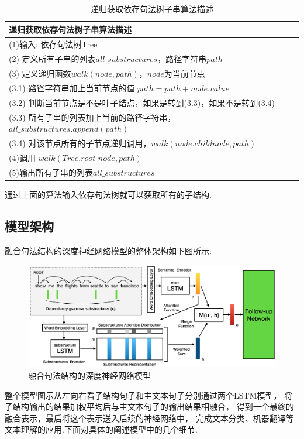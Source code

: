 \documentclass[bachelor,adobefonts]{jnuthesis}
\begin{document}
\begin{table}[h!]
  \centering
  \begin{tabular}{l}
    \toprule
    \textbf{递归获取依存句法树子串算法描述} \\
    \midrule
    (1)输入: 依存句法树Tree \\
    (2) 定义所有子串的列表$all\_substructures$，路径字符串$path$ \\
    (3) 定义递归函数$walk(node,path)$，$node$为当前节点 \\
    (3.1) 路径字符串加上当前节点的值 $path = path + node.value$ \\
    (3.2) 判断当前节点是不是叶子结点，如果是转到(3.3)，如果不是转到(3.4)\\
    (3.3) 所有子串的列表加上当前的路径字符串，$all\_substructures.append(path)$ \\
    (3.4) 对该节点所有的子节点递归调用，$walk(node.childnode,path)$ \\
    (4)调用 $walk(Tree.root\_node,path)$ \\
    (5)输出所有子串的列表$all\_substructures$ \\
    \bottomrule
  \end{tabular}
  \caption{递归获取依存句法树子串算法描述}
\end{table}
通过上面的算法输入依存句法树就可以获取所有的子结构.

\subsection{模型架构}
融合句法结构的深度神经网络模型的整体架构如下图所示:
\begin{figure}[h!]
  \centering
  \includegraphics[width=0.95\linewidth]{model.png}
  \caption{融合句法结构的深度神经网络模型}
\end{figure}

整个模型图示从左向右看子结构句子和主文本句子分别通过两个LSTM模型，
将子结构输出的结果加权平均后与主文本句子的输出结果相融合，
得到一个最终的融合表示，最后将这个表示送入后续的神经网络中，
完成文本分类、机器翻译等文本理解的应用.下面对具体的阐述模型中的几个细节.
\end{document}
